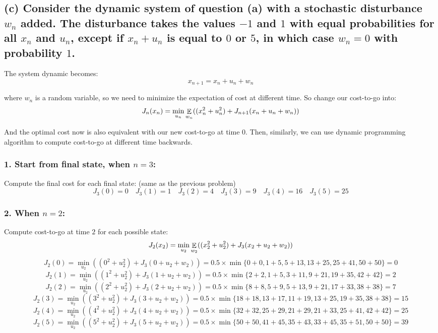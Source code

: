 \subsection*{(c) Consider the dynamic system of question (a) with a stochastic disturbance \( w_n \) added. The disturbance takes the values \( -1 \) and \( 1 \) with equal probabilities for all \( x_n \) and \( u_n \), except if \( x_n + u_n \) is equal to \( 0 \) or \( 5 \), in which case \( w_n = 0 \) with probability \( 1 \).}
The system dynamic becomes:
\[ x_{n+1} = x_n + u_n + w_n \]

where \( w_n \) is a random variable, so we need to minimize the expectation of cost at different time. So change our cost-to-go into:
\[ J_n(x_n) = \min_{u_n} \mathop{\mathbb{E}}_{w_n} ((x_n^2 + u_n^2) + J_{n+1}(x_n + u_n + w_n)) \]

And the optimal cost now is also equivalent with our new cost-to-go at time \( 0 \). Then, similarly, we can use dynamic programming algorithm to compute cost-to-go at different time backwards.

\subsubsection*{1. Start from final state, when \( n = 3 \):}
Compute the final cost for each final state: (same as the previous problem)
\[
    J_3(0) = 0 \quad
    J_3(1) = 1 \quad
    J_3(2) = 4 \quad
    J_3(3) = 9 \quad
    J_3(4) = 16 \quad
    J_3(5) = 25
\]

\subsubsection*{2. When \( n = 2 \):}
Compute cost-to-go at time \( 2 \) for each possible state:
\[ J_2(x_2) = \min_{u_2} \mathop{\mathbb{E}}_{w_2} ((x_2^2 + u_2^2) + J_3(x_2 + u_2 + w_2)) \]
\[
    J_2(0) = \min_{u_2} ((0^2 + u_2^2) + J_3(0 + u_2 + w_2))
    = 0.5 \times \min \{ 0+0, 1+5, 5+13, 13+25, 25+41, 50+50 \}
    = 0
\]
\[
    J_2(1) = \min_{u_2} ((1^2 + u_2^2) + J_3(1 + u_2 + w_2))
    = 0.5 \times \min \{ 2+2, 1+5, 3+11, 9+21, 19+35, 42+42 \}
    = 2
\]
\[
    J_2(2) = \min_{u_2} ((2^2 + u_2^2) + J_3(2 + u_2 + w_2))
    = 0.5 \times \min \{ 8+8, 5+9, 5+13, 9+21, 17+33, 38+38 \}
    = 7
\]
\[
    J_2(3) = \min_{u_2} ((3^2 + u_2^2) + J_3(3 + u_2 + w_2))
    = 0.5 \times \min \{ 18+18, 13+17, 11+19, 13+25, 19+35, 38+38 \}
    = 15
\]
\[
    J_2(4) = \min_{u_2} ((4^2 + u_2^2) + J_3(4 + u_2 + w_2))
    = 0.5 \times \min \{ 32+32, 25+29, 21+29, 21+33, 25+41, 42+42  \}
    = 25
\]
\[
    J_2(5) = \min_{u_2} ((5^2 + u_2^2) + J_3(5 + u_2 + w_2))
    = 0.5 \times \min \{ 50+50, 41+45, 35+43, 33+45, 35+51, 50+50 \}
    = 39
\]

